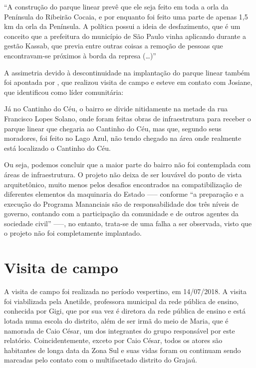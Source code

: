 	\begin{citacao}
	    ``A construção do parque linear prevê que ele seja feito em toda a orla da Península do Ribeirão Cocaia, e por enquanto foi feito uma parte de apenas 1,5 km da orla da Península. A política possui a ideia de desfazimento, que é um conceito que a prefeitura do município de São Paulo vinha aplicando durante a gestão Kassab, que previa entre outras coisas a remoção de pessoas que encontravam-se próximos à borda da represa (\dots)''
    \end{citacao}
    
    A assimetria devido à descontinuidade na implantação do parque linear também foi apontada por , que realizou visita de campo e esteve em contato com Josiane, que identificou como líder comunitária:
    
    \begin{citacao}
		Já no Cantinho do Céu, o bairro se divide nitidamente na metade da rua
	    Francisco Lopes Solano, onde foram feitas obras de infraestrutura para receber o parque linear que chegaria ao Cantinho do Céu, mas que, segundo seus moradores, foi feito no Lago Azul, não tendo chegado na área onde realmente está localizado o Cantinho do Céu.
    \end{citacao}
    
    Ou seja, podemos concluir que a maior parte do bairro não foi contemplada com áreas de infraestrutura. O projeto não deixa de ser louvável do ponto de vista arquitetônico, muito menos pelos desafios encontrados na compatibilização de diferentes elementos da maquinaria do Estado ----- conforme  ``a preparação e a execução do Programa Mananciais são de responsabilidade dos três níveis de governo, contando com a participação da comunidade e de outros agentes da sociedade civil'' -----, no entanto, trata-se de uma falha a ser observada, visto que o projeto não foi completamente implantado.
	
	\section{Visita de campo} \label{visita}
	
	A visita de campo foi realizada no período vespertino, em 14/07/2018. A visita foi viabilizada pela Anetilde, professora municipal da rede pública de ensino, conhecida por Gigi, que por sua vez é diretora da rede pública de ensino e está lotada numa escola do distrito, além de ser irmã do meio de Maria, que é namorada de Caio César, um dos integrantes do grupo responsável por este relatório. Coincidentemente, exceto por Caio César, todos os atores são habitantes de longa data da Zona Sul e suas vidas foram ou continuam sendo marcadas pelo contato com o multifacetado distrito do Grajaú.
	
